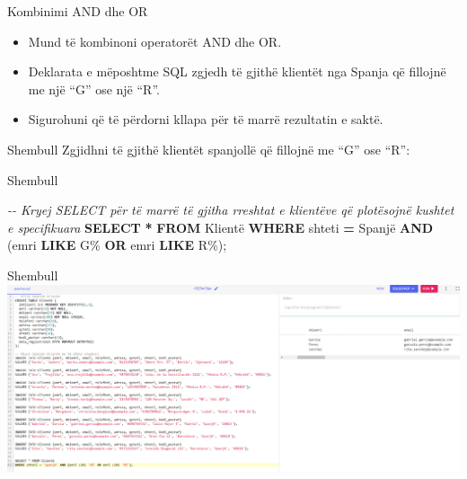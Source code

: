 \documentclass[
  ignorenonframetext,
]{beamer}
\newenvironment{Shaded}{\begin{snugshade}}{\end{snugshade}}
\newcommand{\CommentTok}[1]{\textcolor[rgb]{0.56,0.35,0.01}{\textit{#1}}}
\newcommand{\KeywordTok}[1]{\textcolor[rgb]{0.13,0.29,0.53}{\textbf{#1}}}
\newcommand{\NormalTok}[1]{#1}
\newcommand{\OperatorTok}[1]{\textcolor[rgb]{0.81,0.36,0.00}{\textbf{#1}}}
\newcommand{\StringTok}[1]{\textcolor[rgb]{0.31,0.60,0.02}{#1}}
\begin{document}
\begin{frame}{Kombinimi AND dhe OR}
\label{kombinimi-and-dhe-or-2}
\begin{itemize}
\item
  Mund të kombinoni operatorët AND dhe OR.
\item
  Deklarata e mëposhtme SQL zgjedh të gjithë klientët nga Spanja që
  fillojnë me një ``G'' ose një ``R''.
\item
  Sigurohuni që të përdorni kllapa për të marrë rezultatin e saktë.
\end{itemize}
\end{frame}

\begin{frame}{Shembull}
\label{shembull-37}
Zgjidhni të gjithë klientët spanjollë që fillojnë me ``G'' ose ``R'':
\end{frame}

\begin{frame}[fragile]{Shembull}
\label{shembull-38}

\begin{Shaded}
\begin{Highlighting}[]
\CommentTok{{-}{-} Kryej SELECT për të marrë të gjitha rreshtat e klientëve që plotësojnë kushtet e specifikuara}
\KeywordTok{SELECT} \OperatorTok{*} \KeywordTok{FROM}\NormalTok{ Klientë}
\KeywordTok{WHERE}\NormalTok{ shteti }\OperatorTok{=} \StringTok{\textquotesingle{}Spanjë\textquotesingle{}} \KeywordTok{AND}\NormalTok{ (emri }\KeywordTok{LIKE} \StringTok{\textquotesingle{}G\%\textquotesingle{}} \KeywordTok{OR}\NormalTok{ emri }\KeywordTok{LIKE} \StringTok{\textquotesingle{}R\%\textquotesingle{}}\NormalTok{);}
\end{Highlighting}
\end{Shaded}
\end{frame}

\begin{frame}{Shembull}
\label{shembull-39}
\includegraphics{./Figs/query20.png}
\end{frame}
\end{document}
